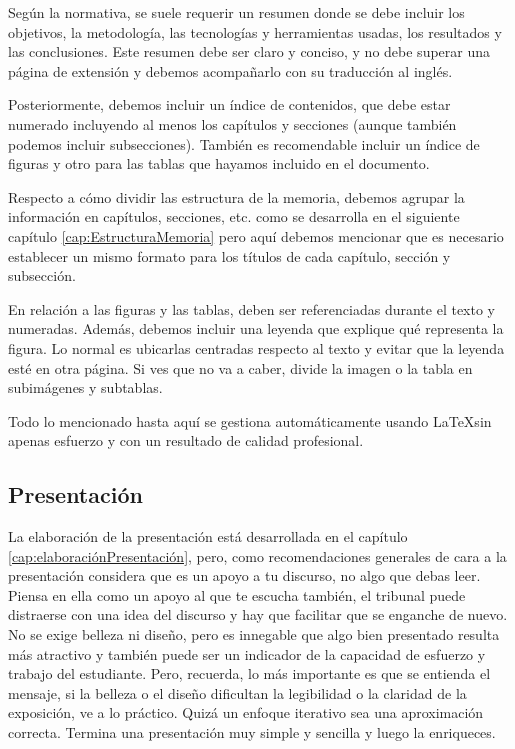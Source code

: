 
Según la normativa, se suele requerir un resumen donde se debe incluir los objetivos, la metodología, las tecnologías y herramientas usadas, los resultados y las conclusiones. Este resumen debe ser claro y conciso, y no debe superar una página de extensión y debemos acompañarlo con su traducción al inglés.

Posteriormente, debemos incluir un índice de contenidos, que debe estar numerado incluyendo al menos los capítulos y secciones (aunque también podemos incluir subsecciones). También es recomendable incluir un índice de figuras y otro para las tablas que hayamos incluido en el documento.

Respecto a cómo dividir las estructura de la memoria, debemos agrupar la información en capítulos, secciones, etc. como se desarrolla en el siguiente capítulo \ref{cap:EstructuraMemoria} pero aquí debemos mencionar que es necesario establecer un mismo formato para los títulos de cada capítulo, sección y subsección.

En relación a las figuras y las tablas, deben ser referenciadas durante el texto y numeradas. Además, debemos incluir una leyenda que explique qué representa la figura. Lo normal es ubicarlas centradas respecto al texto y evitar que la leyenda esté en otra página. Si ves que no va a caber, divide la imagen o la tabla en subimágenes y subtablas.

Todo lo mencionado hasta aquí se gestiona automáticamente usando \LaTeX sin apenas esfuerzo y con un resultado de calidad profesional.

\subsection{Presentación}

La elaboración de la presentación está desarrollada en el capítulo \ref{cap:elaboraciónPresentación}, pero, como recomendaciones generales de cara a la presentación considera que es un apoyo a tu discurso, no algo que debas leer. Piensa en ella como un apoyo al que te escucha también, el tribunal puede distraerse con una idea del discurso y hay que facilitar que se enganche de nuevo. No se exige belleza ni diseño, pero es innegable que algo bien presentado resulta más atractivo y también puede ser un indicador de la capacidad de esfuerzo y trabajo del estudiante. Pero, recuerda, lo más importante es que se entienda el mensaje, si la belleza o el diseño dificultan la legibilidad o la claridad de la exposición, ve a lo práctico. Quizá un enfoque iterativo sea una aproximación correcta. Termina una presentación muy simple y sencilla y luego la enriqueces.


